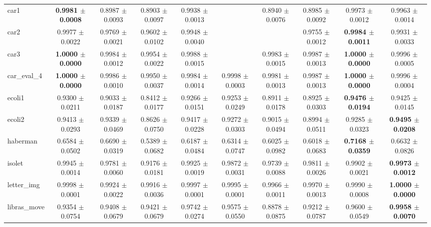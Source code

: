 \begin{table*}[htbp]
\begin{tabular}{lccccccccc}
            car1 & \cellcolor{graybg}\textbf{0.9981 $\pm$ 0.0008} & 0.8987 $\pm$ 0.0093 & 0.8903 $\pm$ 0.0097 & 0.9938 $\pm$ 0.0013 &  & 0.8940 $\pm$ 0.0076 & 0.8985 $\pm$ 0.0092 & 0.9973 $\pm$ 0.0012 & 0.9963 $\pm$ 0.0014 \\ 
            car2 & 0.9977 $\pm$ 0.0022 & 0.9769 $\pm$ 0.0021 & 0.9602 $\pm$ 0.0102 & 0.9948 $\pm$ 0.0040 &  &  & 0.9755 $\pm$ 0.0012 & \cellcolor{graybg}\textbf{0.9984 $\pm$ 0.0011} & 0.9931 $\pm$ 0.0033 \\ 
            car3 & \cellcolor{graybg}\textbf{1.0000 $\pm$ 0.0000} & 0.9984 $\pm$ 0.0012 & 0.9954 $\pm$ 0.0022 & 0.9988 $\pm$ 0.0015 &  & 0.9983 $\pm$ 0.0015 & 0.9987 $\pm$ 0.0013 & \cellcolor{graybg}\textbf{1.0000 $\pm$ 0.0000} & 0.9996 $\pm$ 0.0005 \\ 
            car\_eval\_4 & \cellcolor{graybg}\textbf{1.0000 $\pm$ 0.0000} & 0.9986 $\pm$ 0.0010 & 0.9950 $\pm$ 0.0037 & 0.9984 $\pm$ 0.0014 & 0.9998 $\pm$ 0.0003 & 0.9981 $\pm$ 0.0013 & 0.9987 $\pm$ 0.0013 & \cellcolor{graybg}\textbf{1.0000 $\pm$ 0.0000} & 0.9996 $\pm$ 0.0004 \\ 
            ecoli1 & 0.9300 $\pm$ 0.0211 & 0.9033 $\pm$ 0.0187 & 0.8412 $\pm$ 0.0177 & 0.9266 $\pm$ 0.0151 & 0.9253 $\pm$ 0.0249 & 0.8911 $\pm$ 0.0178 & 0.8925 $\pm$ 0.0303 & \cellcolor{graybg}\textbf{0.9476 $\pm$ 0.0194} & 0.9425 $\pm$ 0.0145 \\ 
            ecoli2 & 0.9413 $\pm$ 0.0293 & 0.9339 $\pm$ 0.0469 & 0.8626 $\pm$ 0.0750 & 0.9417 $\pm$ 0.0228 & 0.9272 $\pm$ 0.0303 & 0.9015 $\pm$ 0.0494 & 0.8994 $\pm$ 0.0511 & 0.9285 $\pm$ 0.0323 & \cellcolor{graybg}\textbf{0.9495 $\pm$ 0.0208} \\ 
            haberman & 0.6584 $\pm$ 0.0502 & 0.6690 $\pm$ 0.0319 & 0.5389 $\pm$ 0.0682 & 0.6187 $\pm$ 0.0484 & 0.6314 $\pm$ 0.0747 & 0.6025 $\pm$ 0.0982 & 0.6018 $\pm$ 0.0683 & \cellcolor{graybg}\textbf{0.7168 $\pm$ 0.0359} & 0.6632 $\pm$ 0.0826 \\ 
            isolet & 0.9945 $\pm$ 0.0014 & 0.9781 $\pm$ 0.0060 & 0.9176 $\pm$ 0.0181 & 0.9925 $\pm$ 0.0019 & 0.9872 $\pm$ 0.0031 & 0.9739 $\pm$ 0.0088 & 0.9811 $\pm$ 0.0026 & 0.9902 $\pm$ 0.0021 & \cellcolor{graybg}\textbf{0.9973 $\pm$ 0.0012} \\ 
            letter\_img & 0.9998 $\pm$ 0.0001 & 0.9924 $\pm$ 0.0022 & 0.9916 $\pm$ 0.0036 & 0.9997 $\pm$ 0.0001 & 0.9995 $\pm$ 0.0001 & 0.9966 $\pm$ 0.0011 & 0.9970 $\pm$ 0.0013 & 0.9990 $\pm$ 0.0008 & \cellcolor{graybg}\textbf{1.0000 $\pm$ 0.0000} \\ 
            libras\_move & 0.9354 $\pm$ 0.0754 & 0.9408 $\pm$ 0.0679 & 0.9421 $\pm$ 0.0679 & 0.9742 $\pm$ 0.0274 & 0.9575 $\pm$ 0.0550 & 0.8878 $\pm$ 0.0875 & 0.9212 $\pm$ 0.0787 & 0.9600 $\pm$ 0.0549 & \cellcolor{graybg}\textbf{0.9958 $\pm$ 0.0070} \\ 

\end{tabular}
\end{table*}
